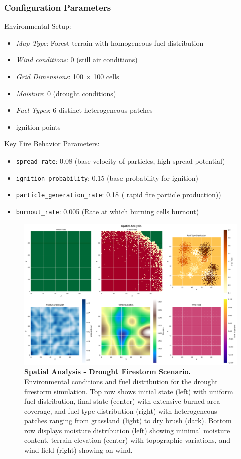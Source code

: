 \subsubsection{Configuration Parameters}
Environmental Setup:
\begin{itemize}
	\item \textit{Map Type}: Forest terrain with homogeneous fuel distribution
	\item \textit{Wind conditions}: 0 (still air conditions)
	\item \textit{Grid Dimensions}: 100 $\times$ 100 cells
	\item \textit{Moisture}: 0 (drought conditions)
	\item \textit{Fuel Types}: 6 distinct heterogeneous patches
	\item \textMultiple ignition points
\end{itemize}
Key Fire Behavior Parameters:
\begin{itemize}
	\item \texttt{spread\_rate}: 0.08 (base velocity of particles, high spread potential)
	\item \texttt{ignition\_probability}: 0.15 (base probability for ignition)
	\item \texttt{particle\_generation\_rate}: 0.18 ( rapid fire particle production))
	\item \texttt{burnout\_rate}: 0.005 (Rate at which burning cells burnout)
\end{itemize}
\begin{figure}[H]
	\centering
	\includegraphics[width=\textwidth]{media/spatial_analysis_df.png}
	\caption{
		\textbf{Spatial Analysis - Drought Firestorm Scenario.}
		Environmental conditions and fuel distribution for the drought firestorm simulation. Top row shows initial state (left) with uniform fuel distribution, final state (center) with extensive burned area coverage, and fuel type distribution (right) with heterogeneous patches ranging from grassland (light) to dry brush (dark). Bottom row displays moisture distribution (left) showing minimal moisture content, terrain elevation (center) with topographic variations, and wind field (right) showing on wind.
	}
	\label{fig:spatial_df}
\end{figure}

